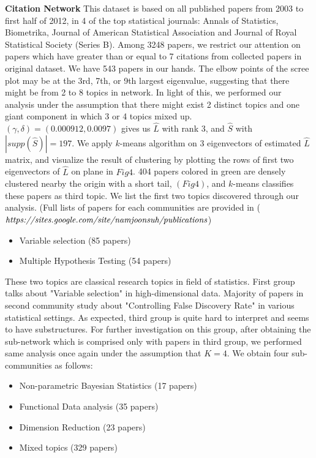 \documentclass[AMS,STIX1COL]{WileyNJD-v2}
\begin{document}
\noindent\textbf{Citation Network} This dataset is based on all published papers from 2003 to first half of 2012, in 4 of the top statistical journals: Annals of Statistics, Biometrika, Journal of American Statistical Association and Journal of Royal Statistical Society (Series B).
Among  3248 papers, we restrict our attention on papers which have greater than or equal to 7 citations from collected papers in original dataset.
We have 543 papers in our hands.
The elbow points of the scree plot may be at the 3rd, 7th, or 9th largest eigenvalue, suggesting that there might be from 2 to 8 topics in network.
In light of this, we performed our analysis under the assumption that there might exist 2 distinct topics and one giant component in which 3 or 4 topics mixed up. \\

\noindent $(\gamma,\delta) = (0.000912,0.0097)$ gives us $\widehat{L}$ with rank 3, and $\widehat{S}$ with $|supp(\widehat{S})|=197$.
We apply $k$-means algorithm on 3 eigenvectors of estimated $\widehat{L}$ matrix, and visualize the result of clustering by plotting the rows of first two eigenvectors of $\widehat{L}$ on plane in $Fig 4$.
404 papers colored in green are densely clustered nearby the origin with a short tail, $(Fig 4)$, and $k$-means classifies these papers as third topic.
We list the first two topics discovered through our analysis.
(Full lists of papers for each communities are provided in ($\emph{https://sites.google.com/site/namjoonsuh/publications}$)

\begin{itemize}
  \item Variable selection (85 papers)
  \item Multiple Hypothesis Testing (54 papers)
\end{itemize}

\noindent These two topics are classical research topics in field of statistics.
First group talks about "Variable selection" in high-dimensional data.
Majority of papers in second community study about "Controlling False Discovery Rate" in various statistical settings.
As expected, third group is quite hard to interpret and seems to have substructures.
For further investigation on this group, after obtaining the sub-network which is comprised only with papers in third group, we performed same analysis once again under the assumption that $K=4$.
We obtain four sub-communities as follows:

\begin{itemize}
  \item Non-parametric Bayesian Statistics (17 papers)
  \item Functional Data analysis (35 papers)
  \item Dimension Reduction (23 papers)
  \item Mixed topics (329 papers)
\end{itemize}
\end{document}
